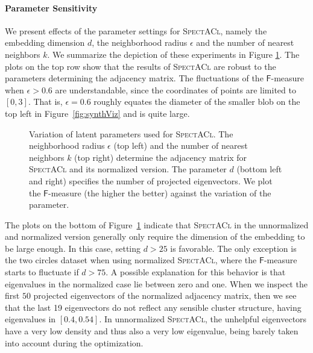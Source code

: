 \paragraph{Parameter Sensitivity}
We present effects of the parameter settings for \textsc{SpectACl}, namely the embedding dimension $d$, the neighborhood radius $\epsilon$ and the number of nearest neighbors $k$. We summarize the depiction of these experiments in Figure \ref{fig:paramPlot}. The plots on the top row show that the results of \textsc{SpectACl} are robust to the parameters determining the adjacency matrix. The fluctuations of the $\mathsf{F}$-measure when $\epsilon>0.6$ are understandable, since the coordinates of points are limited to $[0,3]$. That is, $\epsilon=0.6$ roughly equates the diameter of the smaller blob on the top left in Figure~\ref{fig:synthViz} and is quite large. 
\begin{figure}[t]
\centering

\caption{Variation of latent parameters used for \textsc{SpectACl}. The neighborhood radius $\epsilon$ (top left) and the number of nearest neighbors $k$ (top right) determine the adjacency matrix for \textsc{SpectACl} and its normalized version. The parameter $d$ (bottom left and right) specifies the number of projected eigenvectors. We plot the $\mathsf{F}$-measure (the higher the better) against the variation of the parameter.}
\label{fig:paramPlot}
\end{figure}
The plots on the bottom of Figure~\ref{fig:paramPlot} indicate that \textsc{SpectACl} in the unnormalized and normalized version generally only require the dimension of the embedding to be large enough. In this case, setting $d>25$ is favorable. The only exception is the two circles dataset when using normalized \textsc{SpectACl}, where the $\mathsf{F}$-measure starts to fluctuate if $d>75$. A possible explanation for this behavior is that eigenvalues in the normalized case lie between zero and one. When we inspect the first $50$ projected eigenvectors of the normalized adjacency matrix, then we see that the last 19 eigenvectors do not reflect any sensible cluster structure, having eigenvalues in $[0.4,0.54]$. In unnormalized \textsc{SpectACl}, the unhelpful eigenvectors have a very low density and thus also a very low eigenvalue, being barely taken into account during the optimization.

